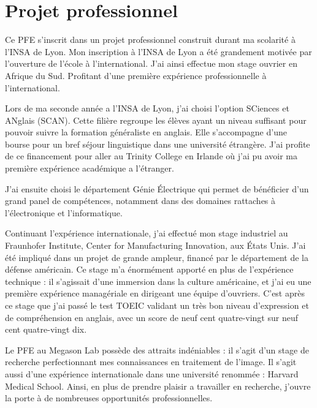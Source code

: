 \clearpage





%


\chapter{Projet professionnel}

Ce PFE s'inscrit dans un projet professionnel construit durant ma scolarité à l'INSA de Lyon.
Mon inscription à l'INSA de Lyon a été grandement motivée par l'ouverture de l'école à l'international. J'ai ainsi effectue mon stage ouvrier en Afrique du Sud. Profitant d'une première expérience professionnelle à l'international.

Lors de ma seconde année a l'INSA de Lyon, j'ai choisi l'option SCiences et ANglais (SCAN).
Cette filière regroupe les élèves ayant un niveau suffisant pour pouvoir suivre la formation généraliste en anglais.
Elle s'accompagne d'une bourse pour un bref séjour linguistique dans une université étrangère.
J'ai profite de ce financement pour aller au Trinity College en Irlande où
j'ai pu avoir ma première expérience académique a l'étranger.

J'ai ensuite choisi le département
Génie Électrique qui permet de bénéficier d'un grand panel de compétences,
notamment dans des domaines rattaches à l'électronique et l'informatique.


Continuant l'expérience internationale, j'ai effectué mon stage industriel au
Fraunhofer Institute, Center for Manufacturing Innovation, aux États Unis.
J'ai été impliqué dans un projet de grande ampleur, financé par le département de la défense américain.
Ce stage m'a énormément apporté en plus de l'expérience technique : il s'agissait d'une immersion dans la culture américaine, et j'ai eu une première expérience managériale en dirigeant une équipe d'ouvriers.
C'est après ce stage que j'ai passé le test TOEIC validant un très bon niveau d'expression et de compréhension en anglais,
avec un score de neuf cent quatre-vingt sur neuf cent quatre-vingt dix.


Le PFE au Megason Lab possède des attraits indéniables :
il s'agit d'un stage de recherche perfectionnant mes connaissances en traitement de l'image.
Il s'agit aussi d'une expérience internationale dans une université renommée : Harvard Medical School.
Ainsi, en plus de prendre plaisir a travailler en recherche, j'ouvre la porte à de nombreuses opportunités professionnelles.

